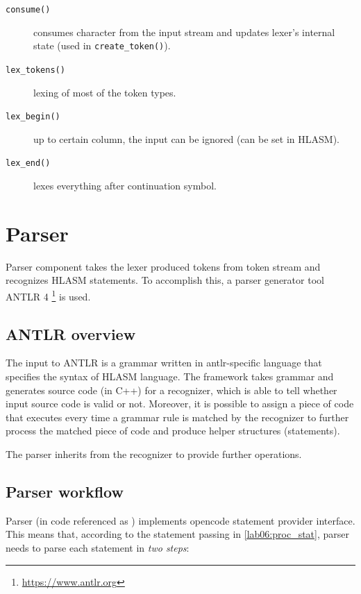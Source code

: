 \begin{description}
\begin{description}
			\item[\texttt{consume()}] consumes character from the input stream and updates lexer's internal state (used in \texttt{create\_token()}).
			
			\item[\texttt{lex\_tokens()}] lexing of most of the token types.
			
			\item[\texttt{lex\_begin()}] up to certain column, the input can be ignored (can be set in HLASM).
			
			\item[\texttt{lex\_end()}] lexes everything after continuation symbol.
			
			
		\end{description}
		
\end{description}


\section{Parser}

Parser component takes the lexer produced tokens from token stream and recognizes HLASM statements. To accomplish this, a parser generator tool ANTLR 4 \footnote{\url{https://www.antlr.org}} is used.

\subsection{ANTLR overview}

The input to ANTLR is a grammar written in antlr-specific language that specifies the syntax of HLASM language. The framework takes grammar and generates source code (in C++) for a recognizer, which is able to tell whether input source code is valid or not. Moreover, it is possible to assign a piece of code that executes every time a grammar rule is matched by the recognizer to further process the matched piece of code and produce helper structures (statements).

The parser inherits from the recognizer to provide further operations.

\subsection{Parser workflow}

Parser (in code referenced as ) implements opencode statement provider interface. This means that, according to the statement passing in \cref{lab06:proc_stat}, parser needs to parse each statement in \emph{two steps}:

